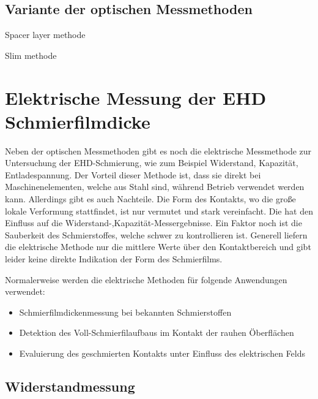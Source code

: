 \subsection{Variante der optischen Messmethoden}
\label{sub:variante_der_optischen_messmethoden}

Spacer layer methode

Slim methode

\section{Elektrische Messung der EHD Schmierfilmdicke}
\label{sec:elektrische_messung_der_ehd_schmierfilmdicke}

Neben der optischen Messmethoden gibt es noch die elektrische Messmethode zur Untersuchung der EHD-Schmierung, wie zum Beispiel Widerstand, Kapazität, Entladespannung.
Der Vorteil dieser Methode ist, dass sie direkt bei Maschinenelementen, welche aus Stahl sind, während Betrieb verwendet werden kann.
Allerdings gibt es auch Nachteile.
Die Form des Kontakts, wo die große lokale Verformung stattfindet, ist nur vermutet und stark vereinfacht.
Die hat den Einfluss auf die Widerstand-,Kapazität-Messergebnisse.
Ein Faktor noch ist die Sauberkeit des Schmierstoffes, welche schwer zu kontrollieren ist.
Generell liefern die elektrische Methode nur die mittlere Werte über den Kontaktbereich und gibt leider keine direkte Indikation der Form des Schmierfilms.

Normalerweise werden die elektrische Methoden für folgende Anwendungen verwendet:
\begin{itemize}
    \item Schmierfilmdickenmessung bei bekannten Schmierstoffen
    \item Detektion des Voll-Schmierfilaufbaus im Kontakt der rauhen Öberflächen
    \item Evaluierung des geschmierten Kontakts unter Einfluss des elektrischen Felds
\end{itemize}

\subsection{Widerstandmessung}
\label{sub:wiederstandmessung}

